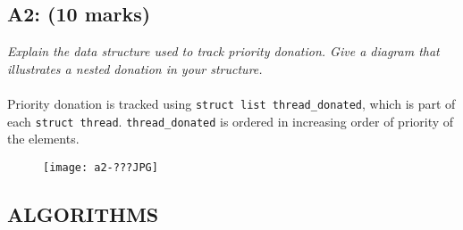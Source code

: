 \documentclass{article}
\begin{document}
\subsection*{A2: (10 marks) }

\textit{Explain the data structure used to track priority donation. Give a diagram that illustrates a nested donation in your structure.}
\\ \\
Priority donation is tracked using \texttt{struct list thread\_donated}, which is part of each
\texttt{struct thread}. \texttt{thread\_donated} is ordered in increasing order of priority of the elements.

\begin{figure}[htb]
\texttt{[image: a2-???JPG]}
\centering
\end{figure}



\subsection{ALGORITHMS}
\end{document}
